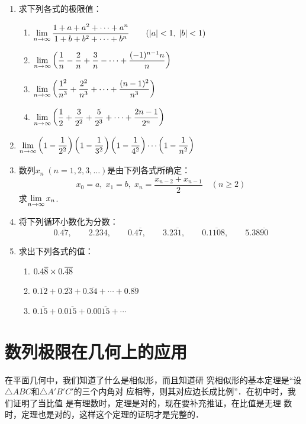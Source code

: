 \begin{enumerate}
\item 求下列各式的极限值：
\begin{enumerate}
    \item  $\displaystyle\lim _{n\to  \infty} \dfrac{1+a+a^{2}+\cdots+a^{n}}{1+b+b^{2}+\cdots+b^{n}} \qquad(|a|<1,\;|b|<1)$
    \item  $\displaystyle\lim _{n\to  \infty}\left(\dfrac{1}{n}-\dfrac{2}{n}+\dfrac{3}{n}-\cdots+\dfrac{(-1)^{n-1} n}{n}\right)$
    \item $\displaystyle\lim _{n\to  \infty}\left(\dfrac{1^{2}}{n^{3}}+\dfrac{2^{2}}{n^{3}}+\cdots+\dfrac{(n-1)^{2}}{n^{3}}\right)$
    \item $\displaystyle\lim _{n\to  \infty}\left(\dfrac{1}{2}+\dfrac{3}{{2^2}}+\dfrac{5}{2^3}+\cdots+\dfrac{2n-1}{2^{n}}\right)$
\end{enumerate}

\item $\displaystyle\lim _{n\to  \infty}\left(1-\dfrac{1}{2^2}\right)\left(1-\dfrac{1}{3^2}\right)\left(1-\dfrac{1}{4^2}\right)\cdots\left(1-\dfrac{1}{n^2}\right)$

\item 数列$x_n\; (n=1,2,3,\ldots)$是由下列各式所确定：
\[x_0=a,\; x_1=b,\; x_n=\frac{x_{n-2}+x_{n-1}}{2}\quad (n\ge 2)\]
求$\displaystyle\lim_{n\to\infty}x_n$.

\item 将下列循环小数化为分数：
\[0.\overline{47},\qquad 2.\overline{234},\qquad 0.4\overline{7},\qquad 3.2\overline{31},\qquad 0.\overline{1108},\qquad 5.38\overline{90}\]
\item 求出下列各式的值：
\begin{enumerate}
    \item $0.4\overline{8}\times0.\overline{48}$
    \item $0.\overline{12}+0.\overline{23}+0.\overline{34}+\cdots+0.\overline{89}$
    \item $0.\overline{15}+0.0\overline{15}+0.00\overline{15}+\cdots$
\end{enumerate}
\end{enumerate}

\section{数列极限在几何上的应用}
在平面几何中，我们知道了什么是相似形，而且知道研
究相似形的基本定理是“设$\triangle ABC$和$\triangle A'B'C'$的三个内角对
应相等，则其对应边长成比例”．在初中时，我们证明了当比值
是有理数时，定理是对的，现在要补充推证，在比值是无理
数时，定理也是对的，这样这个定理的证明才是完整的．

